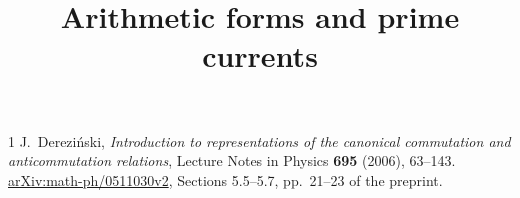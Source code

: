 \documentclass[11pt,oneside]{memoir}
\title{Arithmetic forms and prime currents}
\author{}
\date{}
\begin{document}


\clearpage

\begin{thebibliography}{1}
J.~Derezi\'nski,
\emph{Introduction to representations of the canonical commutation and
anticommutation relations},
Lecture Notes in Physics \textbf{695} (2006), 63--143.
\href{https://arxiv.org/abs/math-ph/0511030v2}{arXiv:math-ph/0511030v2},
Sections 5.5--5.7, pp.~21--23 of the preprint.
\end{thebibliography}
\end{document}
